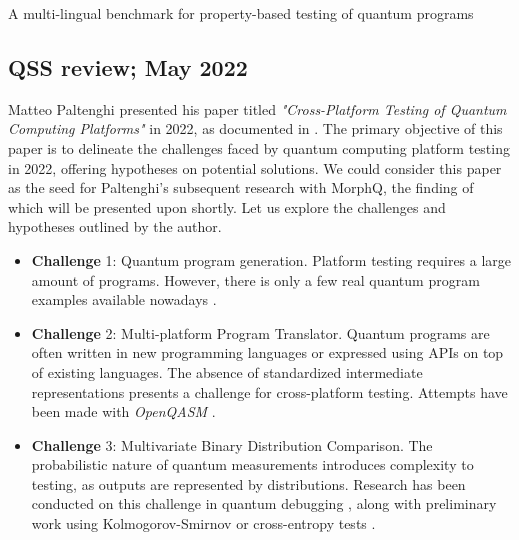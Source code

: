 \begin{itemize}
A multi-lingual benchmark for property-based testing of quantum programs \cite{pontolillo2022multi}

\vspace{15pt}
\subsection{QSS review; May 2022}
Matteo Paltenghi presented his paper titled \textit{"Cross-Platform Testing of Quantum Computing Platforms"} in 2022, as documented in \cite{paltenghi2022cross}. The primary objective of this paper is to delineate the challenges faced by quantum computing platform testing in 2022, offering hypotheses on potential solutions. We could consider this paper as the seed for Paltenghi's subsequent research with MorphQ, the finding of which will be presented upon shortly. Let us explore the challenges and hypotheses outlined by the author.

\vspace{-10pt}
\begin{itemize}
    \item[] \textbf{Challenge} 1: Quantum program generation. Platform testing requires a large amount of programs. However, there is only a few real quantum program examples available nowadays \cite{campos2021qbugs}.
    \item[] \textbf{Challenge} 2: Multi-platform Program Translator. Quantum programs are often written in new programming languages or expressed using APIs on top of existing languages. The absence of standardized intermediate representations presents a challenge for cross-platform testing. Attempts have been made with \textit{OpenQASM} \cite{cross2017open}\cite{cross2022openqasm}.
    \item[] \textbf{Challenge} 3: Multivariate Binary Distribution Comparison. The probabilistic nature of quantum measurements introduces complexity to testing, as outputs are represented by distributions. Research has been conducted on this challenge in quantum debugging \cite{huang2018qdb}\cite{huang2019statistical}\cite{li2020projection} , along with preliminary work using Kolmogorov-Smirnov or cross-entropy tests \cite{wang2021qdiff}.
\end{itemize}


\end{itemize}
